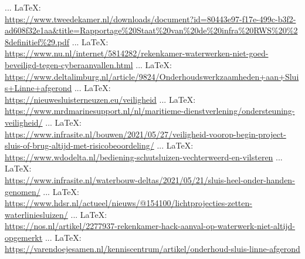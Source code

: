 \begin{thebibliography}{99}
{{{{				
				
				
				
				
				
				
				 ... \LaTeX:\\ \url{https://www.tweedekamer.nl/downloads/document?id=80443e97-f17e-499c-b3f2-ad608f32e1aa&title=Rapportage%20Staat%20van%20de%20infra%20RWS%20%28definitief%29.pdf}
				 ... \LaTeX:\\ \url{https://www.nu.nl/internet/5814282/rekenkamer-waterwerken-niet-goed-beveiligd-tegen-cyberaanvallen.html}
				 ... \LaTeX:\\ \url{https://www.deltalimburg.nl/article/9824/Onderhoudswerkzaamheden+aan+Sluis+Linne+afgerond}
				 ... \LaTeX:\\ \url{https://nieuwesluisterneuzen.eu/veiligheid}
				 ... \LaTeX:\\ \url{https://www.mrdmarinesupport.nl/nl/maritieme-dienstverlening/ondersteuning-veiligheid/}
				 ... \LaTeX:\\ \url{https://www.infrasite.nl/bouwen/2021/05/27/veiligheid-voorop-begin-project-sluis-of-brug-altijd-met-risicobeoordeling/}
				 ... \LaTeX:\\ \url{https://www.wdodelta.nl/bediening-schutsluizen-vechterweerd-en-vilsteren}
				 ... \LaTeX:\\ \url{https://www.infrasite.nl/waterbouw-deltas/2021/05/21/sluis-heel-onder-handen-genomen/}
				 ... \LaTeX:\\ \url{https://www.hdsr.nl/actueel/nieuws/@154100/lichtprojecties-zetten-waterliniesluizen/}
				 ... \LaTeX:\\ \url{https://nos.nl/artikel/2277937-rekenkamer-hack-aanval-op-waterwerk-niet-altijd-opgemerkt}
				 ... \LaTeX:\\ \url{https://varendoejesamen.nl/kenniscentrum/artikel/onderhoud-sluis-linne-afgerond}
}}}}
\end{thebibliography}

